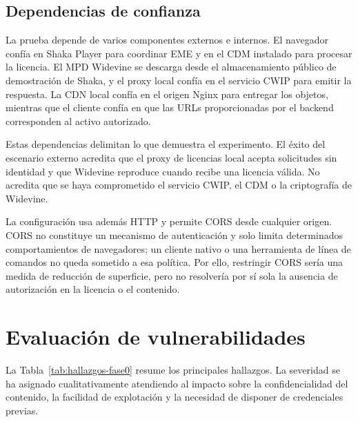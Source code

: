 \subsection{Dependencias de confianza}

La prueba depende de varios componentes externos e internos. El navegador confía en Shaka Player para coordinar EME y en el CDM instalado para procesar la licencia. El MPD Widevine se descarga desde el almacenamiento público de demostración de Shaka, y el proxy local confía en el servicio CWIP para emitir la respuesta. La CDN local confía en el origen Nginx para entregar los objetos, mientras que el cliente confía en que las URLs proporcionadas por el backend corresponden al activo autorizado.

Estas dependencias delimitan lo que demuestra el experimento. El éxito del escenario externo acredita que el proxy de licencias local acepta solicitudes sin identidad y que Widevine reproduce cuando recibe una licencia válida. No acredita que se haya comprometido el servicio CWIP, el CDM o la criptografía de Widevine.

La configuración usa además HTTP y permite CORS desde cualquier origen. CORS no constituye un mecanismo de autenticación y solo limita determinados comportamientos de navegadores; un cliente nativo o una herramienta de línea de comandos no queda sometido a esa política. Por ello, restringir CORS sería una medida de reducción de superficie, pero no resolvería por sí sola la ausencia de autorización en la licencia o el contenido.

\section{Evaluación de vulnerabilidades}

La Tabla~\ref{tab:hallazgos-fase0} resume los principales hallazgos. La severidad se ha asignado cualitativamente atendiendo al impacto sobre la confidencialidad del contenido, la facilidad de explotación y la necesidad de disponer de credenciales previas.

